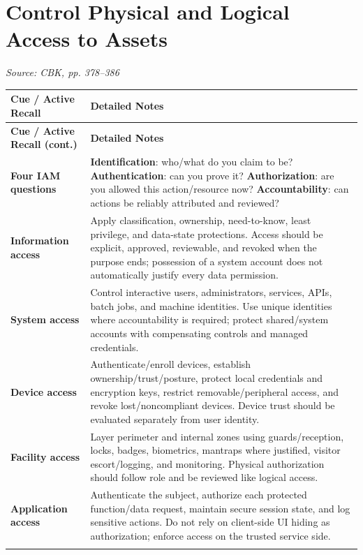 \documentclass[10pt,letterpaper]{article}
\makeatletter
\newenvironment{cornell}{\rowcolors{2}{white}{notebg}\begin{longtable}{@{}>{\raggedright\arraybackslash\columncolor{cuebg}\color{navy}\bfseries}p{0.285\textwidth}>{\raggedright\arraybackslash}p{0.65\textwidth}@{}}\rowcolor{navy}\color{white}\textbf{Cue / Active Recall} & \color{white}\textbf{Detailed Notes}\\ \hline\endfirsthead\rowcolor{navy}\color{white}\textbf{Cue / Active Recall (cont.)} & \color{white}\textbf{Detailed Notes}\\ \hline\endhead}{\end{longtable}}
\newcommand{\noterow}[2]{#1 & #2\\\arrayrulecolor{line}\hline}\newcommand{\source}[1]{\par{\footnotesize\color{teal}\textit{Source: CBK, #1}}\par}
\makeatother
\begin{document}
\section{\color{navy}Control Physical and Logical Access to Assets}
\source{pp. 378--386}
\begin{cornell}
\noterow{Four IAM questions}{\textbf{Identification}: who/what do you claim to be? \textbf{Authentication}: can you prove it? \textbf{Authorization}: are you allowed this action/resource now? \textbf{Accountability}: can actions be reliably attributed and reviewed?}
\noterow{Information access}{Apply classification, ownership, need-to-know, least privilege, and data-state protections. Access should be explicit, approved, reviewable, and revoked when the purpose ends; possession of a system account does not automatically justify every data permission.}
\noterow{System access}{Control interactive users, administrators, services, APIs, batch jobs, and machine identities. Use unique identities where accountability is required; protect shared/system accounts with compensating controls and managed credentials.}
\noterow{Device access}{Authenticate/enroll devices, establish ownership/trust/posture, protect local credentials and encryption keys, restrict removable/peripheral access, and revoke lost/noncompliant devices. Device trust should be evaluated separately from user identity.}
\noterow{Facility access}{Layer perimeter and internal zones using guards/reception, locks, badges, biometrics, mantraps where justified, visitor escort/logging, and monitoring. Physical authorization should follow role and be reviewed like logical access.}
\noterow{Application access}{Authenticate the subject, authorize each protected function/data request, maintain secure session state, and log sensitive actions. Do not rely on client-side UI hiding as authorization; enforce access on the trusted service side.}
\end{cornell}
\end{document}
